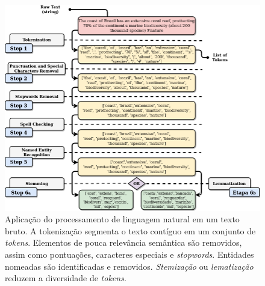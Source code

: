 \documentclass{SBCbookchapter}
\begin{document}
\begin{figure}[tb!]
	\centering
	\includegraphics[width=1\columnwidth]{nlp_schema_layers.png}
	\vspace{4mm}
	\caption{Aplicação do processamento de linguagem natural em um texto bruto. A tokenização segmenta o texto contíguo em um conjunto de \textit{tokens}. Elementos de pouca relevância semântica são removidos, assim como pontuações, caracteres especiais e \textit{stopwords}. Entidades nomeadas são identificadas e removidos. \textit{Stemização} ou \textit{lematização} reduzem a diversidade de \textit{tokens}.}
	\label{fig:esquema_nlp}
	\vspace{-8mm}
\end{figure}
\end{document}
